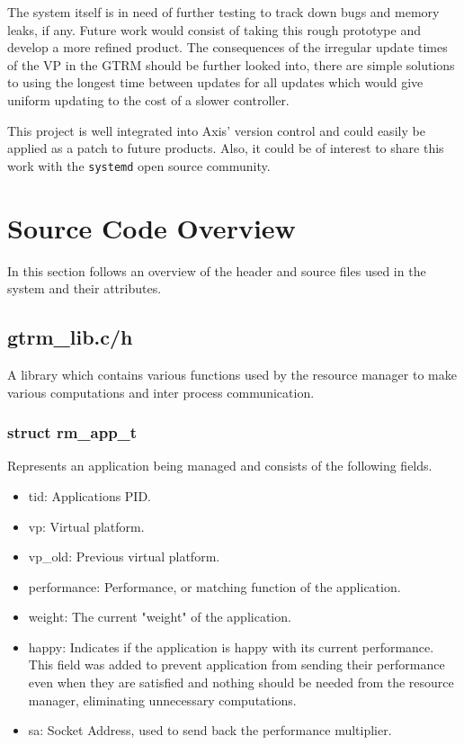 \documentclass[nobiblatex]{LTHthesis}
\begin{document}
The system itself is in need of further testing to track down bugs and
memory leaks, if any. Future work would consist of taking this rough
prototype and develop a more refined product. The consequences of the irregular update times of the VP
in the GTRM should be further looked into, there are simple solutions to using the longest time 
between updates for all updates which would give uniform updating to the cost of a slower controller.


This project is well 
integrated into Axis' version control and could easily be applied as a 
patch to future products. Also, it could be of interest to share this 
work with the \texttt{systemd} open source community.





\appendix

\chapter{Source Code Overview}

In this section follows an overview of the header and source files used in the system and their attributes.

\section{gtrm\_lib.c/h}
A library which contains various functions used by the resource manager to make various computations and inter process communication.

\subsection{struct rm\_app\_t}
Represents an application being managed and consists of the following fields.
\begin{itemize}
\item tid: Applications PID.
\item vp: Virtual platform.
\item vp\_old: Previous virtual platform.
\item performance: Performance, or matching function of the application.
\item weight: The current "weight" of the application.
\item happy: Indicates if the application is happy with its 
      current performance. This field was added to prevent application from sending their performance even when they are satisfied and nothing should be needed from the resource manager, eliminating unnecessary computations.
\item sa: Socket Address, used to send back the performance multiplier.
\end{itemize}
\end{document}
